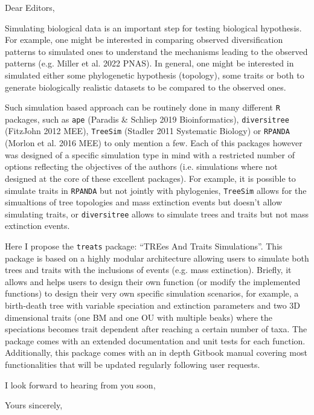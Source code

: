 \documentclass[11pt]{letter}
\begin{document}
\begin{letter}{}
\opening{Dear Editors,}

Simulating biological data is an important step for testing biological hypothesis.
For example, one might be interested in comparing observed diversification patterns to simulated ones to understand the mechanisms leading to the observed patterns (e.g. Miller et al. 2022 PNAS).
In general, one might be interested in simulated either some phylogenetic hypothesis (topology), some traits or both to generate biologically realistic datasets to be compared to the observed ones.

Such simulation based approach can be routinely done in many different \texttt{R} packages, such as \texttt{ape} (Paradis \& Schliep 2019 Bioinformatics), \texttt{diversitree} (FitzJohn 2012 MEE), \texttt{TreeSim} (Stadler 2011 Systematic Biology) or \texttt{RPANDA} (Morlon et al. 2016 MEE) to only mention a few.
Each of this packages however was designed of a specific simulation type in mind with a restricted number of options reflecting the objectives of the authors (i.e. simulations where not designed at the core of these excellent packages).
For example, it is possible to simulate traits in \texttt{RPANDA} but not jointly with phylogenies, \texttt{TreeSim} allows for the simualtions of tree topologies and mass extinction events but doesn't allow simulating traits, or \texttt{diversitree} allows to simulate trees and traits but not mass extinction events.

Here I propose the \texttt{treats} package: ``TREes And Traits Simulations''.
This package is based on a highly modular architecture allowing users to simulate both trees and traits with the inclusions of events (e.g. mass extinction).
Briefly, it allows and helps users to design their own function (or modify the implemented functions) to design their very own specific simulation scenarios, for example, a birth-death tree with variable speciation and extinction parameters and two 3D dimensional traits (one BM and one OU with multiple beaks) where the speciations becomes trait dependent after reaching a certain number of taxa.
The package comes with an extended documentation and unit tests for each function.
Additionally, this package comes with an in depth Gitbook manual covering most functionalities that will be updated regularly following user requests.

I look forward to hearing from you soon,

\closing{Yours sincerely,}

\end{letter}
\end{document}
